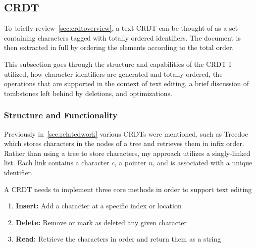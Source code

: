 \documentclass[12pt,a4paper,twoside,openright]{report}
\begin{document}
	
	\subsection{CRDT}
		To briefly review~\cref{sec:crdtoverview}, a text CRDT can be thought of as a set containing characters tagged with totally ordered identifiers. The document is then extracted in full by ordering the elements according to the total order. 
		
		This subsection goes through the structure and capabilities of the CRDT I utilized, how character identifiers are generated and totally ordered, the operations that are supported in the context of text editing, a brief discussion of tombstones left behind by deletions, and optimizations.
		
		\subsubsection{Structure and Functionality} \label{sec:crdtstructure}
		Previously in~\cref{sec:relatedwork} various CRDTs were mentioned, such as Treedoc which stores characters in the nodes of a tree and retrieves them in infix order. Rather than using a tree to store characters, my approach utilizes a singly-linked list. Each link contains a character $c$, a pointer $n$, and is associated with a unique identifier.
		
		A CRDT needs to implement three core methods in order to support text editing
		\begin{enumerate}
			\item \textbf{Insert:} Add a character at a specific index or location
			\item \textbf{Delete:} Remove or mark as deleted any given character
			\item \textbf{Read:} Retrieve the characters in order and return them as a string
		\end{enumerate} 
		
\end{document}
